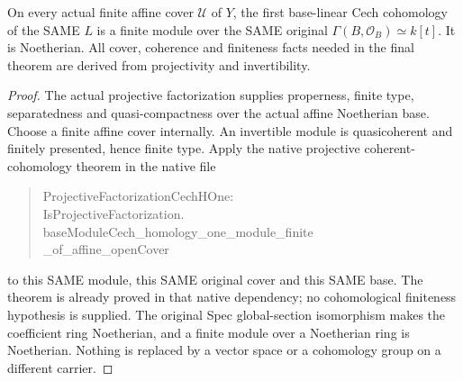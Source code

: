 \begin{theorem}
\label{thm:projective-central-fibre-native-hone-finite}
\leanok
On every actual finite affine cover $\mathcal U$ of $Y$, the first
base-linear Cech cohomology of the SAME $L$ is a finite module over the
SAME original $\Gamma(B,\mathcal O_B)\simeq k[t]$. It is Noetherian.
All cover, coherence and finiteness facts needed in the final theorem
are derived from projectivity and invertibility.
\end{theorem}
\begin{proof}
The actual projective factorization supplies properness, finite type,
separatedness and quasi-compactness over the actual affine Noetherian
base. Choose a finite affine cover internally. An invertible module is
quasicoherent and finitely presented, hence finite type. Apply the native
projective coherent-cohomology theorem in the native file
\begin{quote}\small\ttfamily
ProjectiveFactorizationCechHOne:\\
IsProjectiveFactorization.\\
baseModuleCech\_homology\_one\_module\_finite\\
\_of\_affine\_openCover
\end{quote}
to this SAME module, this SAME original cover and this SAME base.
The theorem is already proved in that native dependency; no cohomological
finiteness hypothesis is supplied. The original Spec global-section isomorphism
makes the coefficient ring Noetherian, and a finite module over a
Noetherian ring is Noetherian. Nothing is replaced by a vector space
or a cohomology group on a different carrier.
\end{proof}

